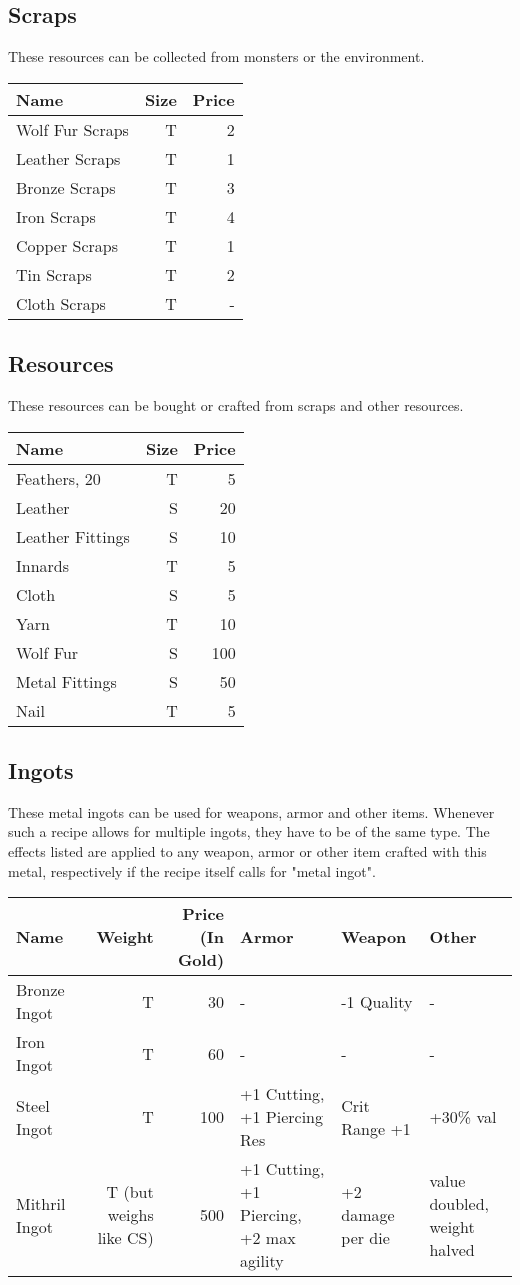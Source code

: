 \subsection{Scraps}\label{subsec:scraps}
These resources can be collected from monsters or the environment.
\begin{longtable}{l | r | r }
	Name & Size & Price\\ \hline
	Wolf Fur Scraps & T & 2\\
	Leather Scraps & T & 1\\
	Bronze Scraps & T & 3\\
	Iron Scraps & T & 4\\
	Copper Scraps & T & 1\\
	Tin Scraps & T & 2\\
	Cloth Scraps & T & -\\
\end{longtable}

\subsection{Resources}\label{subsec:resources}
These resources can be bought or crafted from scraps and other resources.
\begin{longtable}{l | r | r }
	Name & Size & Price\\ \hline
	Feathers, 20 & T & 5\\
	Leather & S & 20\\
	Leather Fittings & S & 10\\
	Innards & T & 5\\
	Cloth & S & 5\\
	Yarn & T & 10\\
	Wolf Fur & S & 100\\
	Metal Fittings & S & 50\\
	Nail & T & 5\\
\end{longtable}

\subsection{Ingots}\label{subsec:ingots}
These metal ingots can be used for weapons, armor and other items.
Whenever such a recipe allows for multiple ingots, they have to be of the same type.
The effects listed are applied to any weapon, armor or other item crafted with this metal, respectively if the recipe itself calls for "metal ingot".
\begin{longtable}{l | r | r | p{2cm} | p{2cm} | p{2cm}}
	Name & Weight & Price (In Gold) & Armor & Weapon & Other\\ \hline
	Bronze Ingot & T & 30 & - & -1 Quality & -\\
	Iron Ingot & T & 60 & - & - & -\\
	Steel Ingot & T & 100 & +1 Cutting, +1 Piercing Res & Crit Range +1 & +30\% val\\
	Mithril  Ingot & T (but weighs like CS) & 500 & +1 Cutting, +1 Piercing, +2 max agility & +2 damage per die & value doubled, weight halved\\
\end{longtable}

